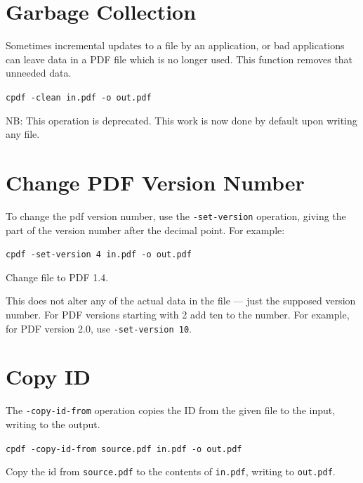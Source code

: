 \documentclass{book}
\begin{document}
  \section{Garbage Collection}
  Sometimes incremental updates to a file by an application, or bad
applications can leave data in a PDF file which is no longer used. This
function removes that unneeded data.

  \begin{framed}
  \small\noindent\verb!cpdf -clean in.pdf -o out.pdf!
  \end{framed}

\noindent NB: This operation is deprecated. This work is now done by default upon writing any file.

   \section{Change PDF Version Number}
   \label{setversion}
   To change the pdf version number, use the \texttt{-set-version} operation,
giving the part of the version number after the decimal point. For example:

  \begin{framed}
  \small\noindent\verb!cpdf -set-version 4 in.pdf -o out.pdf!

  \vspace{2.5mm}
  \noindent Change file to PDF 1.4.
  \end{framed} 

  \noindent This does not alter any of the actual data in the file ---
just the supposed version number. For PDF versions starting with 2 add ten to the number. For example, for PDF version 2.0, use \texttt{-set-version 10}.

  \section{Copy ID}
  The \texttt{-copy-id-from} operation copies the ID from the given file to the
input, writing to the output.

  \begin{framed}
  \small\noindent\verb!cpdf -copy-id-from source.pdf in.pdf -o out.pdf!

  \vspace{2.5mm}
  \noindent Copy the id from \texttt{source.pdf} to the contents of \texttt{in.pdf}, writing to \texttt{out.pdf}.
  \end{framed}
\end{document}
